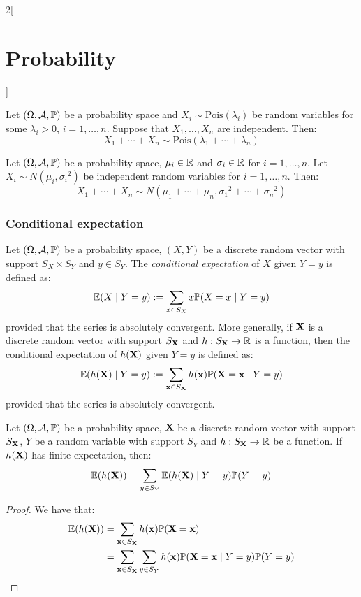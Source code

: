\documentclass[../../../main_math.tex]{subfiles}
\begin{document}
\begin{multicols}{2}[\section{Probability}]
\begin{proposition}
    Let $(\Omega,\mathcal{A},\mathbb{P})$ be a probability space and $X_i\sim\text{Pois}(\lambda_i)$ be random variables for some $\lambda_i>0$, $i=1,\ldots,n$. Suppose that $X_1,\ldots,X_n$ are independent. Then:
    $$X_1+\cdots+X_n\sim\text{Pois}(\lambda_1+\cdots+\lambda_n)$$
  \end{proposition}
  \begin{proposition}
    Let $(\Omega,\mathcal{A},\mathbb{P})$ be a probability space, $\mu_i\in\mathbb{R}$ and $\sigma_i\in\mathbb{R}$ for $i=1,\ldots,n$. Let $X_i\sim N(\mu_i,{\sigma_i}^2)$ be independent random variables for $i=1,\ldots,n$. Then: $$X_1+\cdots+X_n\sim N(\mu_1+\cdots+\mu_n,{\sigma_1}^2+\cdots+{\sigma_n}^2)$$
  \end{proposition}
  \subsubsection{Conditional expectation}
  \begin{definition}
    Let $(\Omega,\mathcal{A},\mathbb{P})$ be a probability space, $(X,Y)$ be a discrete random vector with support $S_X\times S_Y$ and $y\in S_Y$. The \emph{conditional expectation} of $X$ given $Y=y$ is defined as: $$\mathbb{E}(X\mid Y=y):=\sum_{x\in S_X}x\mathbb{P}(X=x\mid Y=y)$$ provided that the series is absolutely convergent. More generally, if $\boldsymbol{\mathrm{X}}$ is a discrete random vector with support $S_{\boldsymbol{\mathrm{X}}}$ and $h:S_{\boldsymbol{\mathrm{X}}}\rightarrow\mathbb{R}$ is a function, then the conditional expectation of $h(\boldsymbol{\mathrm{X}})$ given $Y=y$ is defined as: $$\mathbb{E}(h(\boldsymbol{\mathrm{X}})\mid Y=y):=\sum_{\boldsymbol{\mathrm{x}}\in S_{\boldsymbol{\mathrm{X}}}}h(\boldsymbol{\mathrm{x}})\mathbb{P}(\boldsymbol{\mathrm{X}}=\boldsymbol{\mathrm{x}}\mid Y=y)$$ provided that the series is absolutely convergent.
  \end{definition}
  \begin{proposition}\label{P:totalexp}
    Let $(\Omega,\mathcal{A},\mathbb{P})$ be a probability space, $\boldsymbol{\mathrm{X}}$ be a discrete random vector with support $S_{\boldsymbol{\mathrm{X}}}$, $Y$ be a random variable with support $S_Y$ and $h:S_{\boldsymbol{\mathrm{X}}}\rightarrow\mathbb{R}$ be a function. If $h(\boldsymbol{\mathrm{X}})$ has finite expectation, then: $$\mathbb{E}(h(\boldsymbol{\mathrm{X}}))=\sum_{y\in S_Y}\mathbb{E}(h(\boldsymbol{\mathrm{X}})\mid Y=y)\mathbb{P}(Y=y)$$
  \end{proposition}
  \begin{proof}
    We have that:
    \begin{align*}
      \Exp(h(\vf{X})) & =\sum_{\vf{x}\in S_{\vf{X}}}h(\vf{x})\Prob(\vf{X}=\vf{x})                                  \\
                      & =\sum_{\vf{x}\in S_{\vf{X}}}\sum_{y\in S_Y}h(\vf{x})\Prob(\vf{X}=\vf{x}\mid Y=y)\Prob(Y=y) \\

\end{align*}
\end{proof}
\end{multicols}
\end{document}
